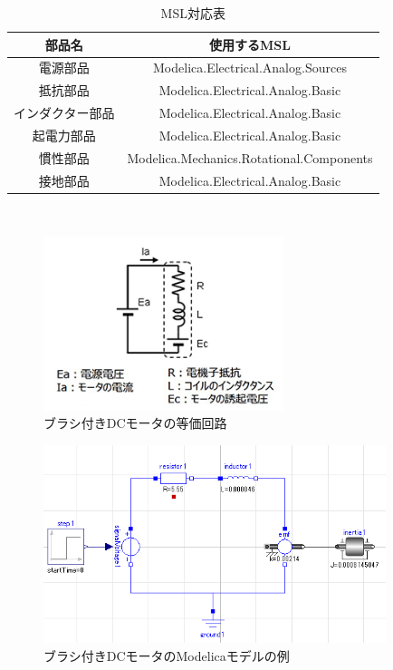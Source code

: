 \begin{table}[t]
	\centering
	\caption{MSL対応表}
	\begin{tabular}{|c|c|} \hline
	  部品名 & 使用するMSL \\ \hline \hline
	  電源部品 & Modelica.Electrical.Analog.Sources \\ \hline
	  抵抗部品 & Modelica.Electrical.Analog.Basic \\ \hline
	  インダクター部品 & Modelica.Electrical.Analog.Basic \\ \hline
	  起電力部品 & Modelica.Electrical.Analog.Basic \\ \hline
	  慣性部品 & Modelica.Mechanics.Rotational.Components \\ \hline
	  接地部品 & Modelica.Electrical.Analog.Basic \\ \hline
	\end{tabular}
	\label{tab:MSL}
  \end{table}
　
\begin{figure}[t]
	\centering
	\includegraphics[width=7cm]{./Image/touka.png}
	\caption{ブラシ付きDCモータの等価回路}
	\label{fig:touka}
  \end{figure}

\begin{figure}[t]
  \centering
  \includegraphics[width=10cm]{./Image/tantai_model.png}
  \caption{ブラシ付きDCモータのModelicaモデルの例}
  \label{fig:tantai_model}
\end{figure}


